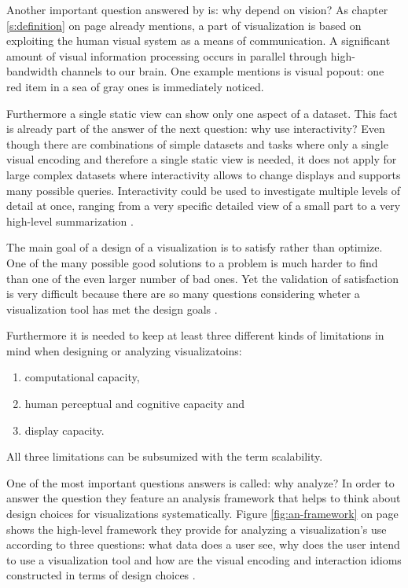 
Another important question answered by \citeauthor{Munzner2014} is: why depend on vision? As chapter \ref{s:definition} on page \pageref{s:definition} already mentions, a part of visualization is based on exploiting the human visual system as a means of communication. A significant amount of visual information processing occurs in parallel through high-bandwidth channels to our brain. One example \citeauthor{Munzner2014} mentions is visual popout: one red item in a sea of gray ones is immediately noticed.

Furthermore a single static view can show only one aspect of a dataset. This fact is already part of the answer of the next question: why use interactivity? Even though there are combinations of simple datasets and tasks where only a single visual encoding and therefore a single static view is needed, it does not apply for large complex datasets where interactivity allows to change displays and supports many possible queries. Interactivity could be used to investigate multiple levels of detail at once, ranging from a very specific detailed view of a small part to a very high-level summarization .

The main goal of a design of a visualization is to satisfy rather than optimize. One of the many possible good solutions to a problem is much harder to find than one of the even larger number of bad ones. Yet the validation of satisfaction is very difficult because there are so many questions considering wheter a visualization tool has met the design goals .

Furthermore it is needed to keep at least three different kinds of limitations in mind when designing or analyzing visualizatoins:
\begin{enumerate}
\item computational capacity,
\item human perceptual and cognitive capacity and
\item display capacity.
\end{enumerate}

All three limitations can be subsumized with the term scalability.

One of the most important questions \citeauthor{Munzner2014} answers is called: why analyze? In order to answer the question they feature an analysis framework that helps to think about design choices for visualizations systematically. Figure \ref{fig:an-framework} on page \pageref{fig:an-framework} shows the high-level framework they provide for analyzing a visualization's use according to three questions: what data does a user see, why does the user intend to use a visualization tool and how are the visual encoding and interaction idioms constructed in terms of design choices .

